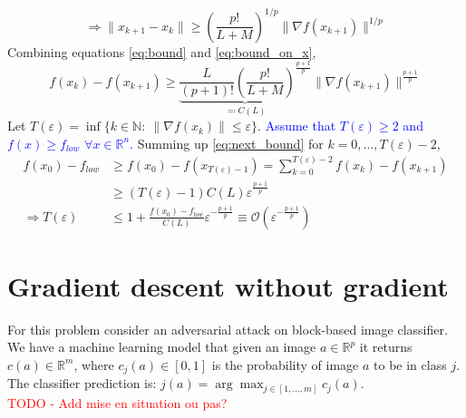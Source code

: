 \documentclass[12pt, openany]{report}
\newcommand{\R}{\mathbb{R}}
\renewcommand{\O}{\mathcal{O}}
\theoremstyle{definition}
\begin{document}
\begin{equation}\label{eq:bound_on_x}
	\Longrightarrow \lVert x_{k+1}-x_k\rVert \ge \left(\frac{p!}{L+M}\right)^{1/p}\lVert \nabla f(x_{k+1})\rVert^{1/p}
\end{equation}
Combining equations \eqref{eq:bound} and \eqref{eq:bound_on_x}, 
\begin{equation}\label{eq:next_bound}
	f(x_k)-f(x_{k+1}) \ge \underbrace{\frac{L}{(p+1)!}\left(\frac{p!}{L+M}\right)^{\frac{p+1}{p}}}_{\eqcolon C(L)} \lVert \nabla f(x_{k+1})\rVert^{\frac{p+1}{p}}
\end{equation}
Let $T(\varepsilon) = \inf \{k\in \mathbb{N}:\: \lVert \nabla f(x_k)\rVert\le \varepsilon\}$. \textcolor{blue}{Assume that $T(\varepsilon)\ge 2$ and $f(x)\ge f_{low}$ $\forall x\in \R^n$.} Summing up \eqref{eq:next_bound} for $k=0,\dots, T(\varepsilon)-2$,
\begin{equation}
	\begin{aligned}
		f(x_0)-f_{low} &\ge f(x_0)-f(x_{T(\varepsilon)-1}) = \sum_{k=0}^{T(\varepsilon)-2} f(x_k)-f(x_{k+1}) \\ 
		& \ge (T(\varepsilon)-1)C(L) \varepsilon^{\frac{p+1}{p}}\\
		\Longrightarrow T(\varepsilon) &\le 1 + \frac{f(x_0)-f_{low}}{C(L)} \varepsilon^{-\frac{p+1}{p}} \equiv \O\left(\varepsilon^{-\frac{p+1}{p}}\right)
	\end{aligned}
\end{equation}
\chapter{Gradient descent without gradient}\label{chap:}
For this problem consider an adversarial attack on block-based image classifier. We have a machine learning model that given an image $a\in\R^p$ it returns $c(a)\in\R^m$, where $c_j(a) \in [0,1]$ is the probability of image $a$ to be in class $j$. The classifier prediction is: $j(a) = \arg\max_{j\in [1,\dots,m]} c_j(a)$.\\
\textcolor{red}{TODO - Add mise en situation ou pas?}
\newline
\end{document}
